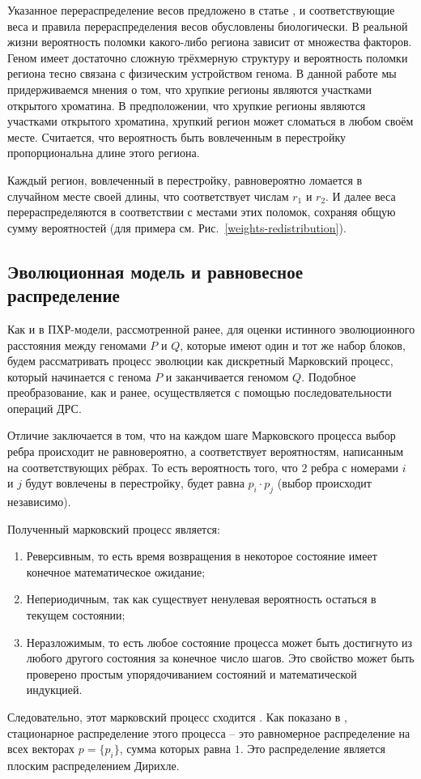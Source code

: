 Указанное перераспределение весов предложено в статье \cite{fr-4}, и соответствующие веса и правила перераспределения весов обусловлены биологически.
В реальной жизни вероятность поломки какого-либо региона зависит от множества факторов.
Геном имеет достаточно сложную трёхмерную структуру \cite{3d} и вероятность поломки региона тесно связана с физическим устройством генома.
В данной работе мы придерживаемся мнения о том, что хрупкие регионы являются участками открытого хроматина.
В предположении, что хрупкие регионы являются участками открытого хроматина, хрупкий регион может сломаться в любом своём месте. Считается, что вероятность быть вовлеченным в перестройку пропорциональна длине этого региона.

Каждый регион, вовлеченный в перестройку, равновероятно ломается в случайном месте своей длины, что соответствует числам $r_1$ и $r_2$.
И далее веса перераспределяются в соответствии с местами этих поломок, сохраняя общую сумму вероятностей (для примера см. Рис.~\ref{weights-redistribution}).

\subsection{Эволюционная модель и равновесное распределение}
Как и в ПХР-модели, рассмотренной ранее, для оценки истинного эволюционного расстояния между геномами $P$ и $Q$, которые имеют один и тот же набор блоков, будем рассматривать процесс эволюции как дискретный Марковский процесс, который начинается с генома $P$ и заканчивается геномом $Q$.
Подобное преобразование, как и ранее, осуществляется с помощью последовательности операций ДРС.

Отличие заключается в том, что на каждом шаге Марковского процесса выбор ребра происходит не равновероятно, а соответствует вероятностям, написанным на соответствующих рёбрах.
То есть вероятность того, что $2$ ребра с номерами $i$ и $j$ будут вовлечены в перестройку, будет равна $p_i \cdot p_j$ (выбор происходит независимо).

Полученный марковский процесс является:
\begin{enumerate}
    \item Реверсивным, то есть время возвращения в некоторое состояние имеет конечное математическое ожидание;
    \item Непериодичным, так как существует ненулевая вероятность остаться в текущем состоянии;
    \item Неразложимым, то есть любое состояние процесса может быть достигнуто из любого другого состояния за конечное число шагов. Это свойство может быть проверено простым упорядочиванием состояний и математической индукцией. \\
\end{enumerate}
Следовательно, этот марковский процесс сходится \cite{teor-ver}.
Как показано в \cite{fr-4}, стационарное распределение этого процесса -- это равномерное распределение на всех векторах $p = \{p_i\}$, сумма которых равна $1$.
Это распределение является плоским распределением Дирихле.

